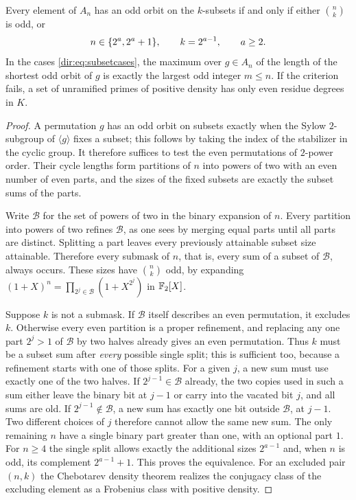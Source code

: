\begin{theorem}\label{dir:thm:subsets}
Every element of $A_n$ has an odd orbit on the $k$-subsets if and only if either
$\binom nk$ is odd, or
\begin{equation}\label{dir:eq:subsetcases}
 n\in\{2^a,2^a+1\},\qquad k=2^{a-1},\qquad a\ge2 .
\end{equation}
In the cases \eqref{dir:eq:subsetcases}, the maximum over $g\in A_n$ of the length of
the shortest odd orbit of $g$ is exactly the largest odd integer $m\le n$. If the
criterion fails, a set of unramified primes of positive density has only even residue
degrees in $K$.
\end{theorem}

\begin{proof}
A permutation $g$ has an odd orbit on subsets exactly when the Sylow $2$-subgroup of
$\langle g\rangle$ fixes a subset; this follows by taking the index of the stabilizer
in the cyclic group. It therefore suffices to test the even permutations of $2$-power
order. Their cycle lengths form partitions of $n$ into powers of two with an even
number of even parts, and the sizes of the fixed subsets are exactly the subset sums
of the parts.

Write $\mathcal B$ for the set of powers of two in the binary expansion of $n$. Every
partition into powers of two refines $\mathcal B$, as one sees by merging equal parts
until all parts are distinct. Splitting a part leaves every previously attainable
subset size attainable. Therefore every submask of $n$, that is, every sum of a subset
of $\mathcal B$, always occurs. These sizes have $\binom nk$ odd, by expanding
$(1+X)^n=\prod_{2^j\in\mathcal B}(1+X^{2^j})$ in $\mathbb{F}_2[X]$.

Suppose $k$ is not a submask. If $\mathcal B$ itself describes an even permutation, it
excludes $k$. Otherwise every even partition is a proper refinement, and replacing any
one part $2^j>1$ of $\mathcal B$ by two halves already gives an even permutation. Thus
$k$ must be a subset sum after \emph{every} possible single split; this is sufficient
too, because a refinement starts with one of those splits. For a given $j$, a new sum
must use exactly one of the two halves. If $2^{j-1}\in\mathcal B$ already, the two
copies used in such a sum either leave the binary bit at $j-1$ or carry into the
vacated bit $j$, and all sums are old. If $2^{j-1}\notin\mathcal B$, a new sum has
exactly one bit outside $\mathcal B$, at $j-1$. Two different choices of $j$ therefore
cannot allow the same new sum. The only remaining $n$ have a single binary part
greater than one, with an optional part $1$. For $n\ge4$ the single split allows
exactly the additional sizes $2^{a-1}$ and, when $n$ is odd, its complement
$2^{a-1}+1$. This proves the equivalence. For an excluded pair $(n,k)$ the Chebotarev
density theorem realizes the conjugacy class of the excluding element as a Frobenius
class with positive density.


\end{proof}
